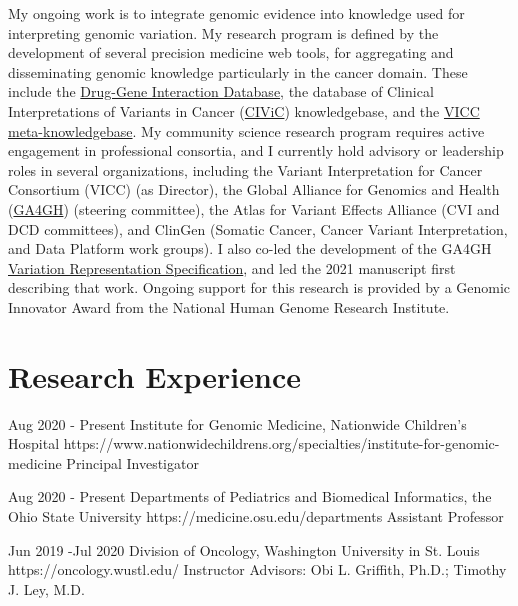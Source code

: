\documentclass[10pt]{article} %
\begin{document}
My ongoing work is to integrate genomic evidence into knowledge used for interpreting genomic variation. My research program is defined by the development of several precision medicine web tools, for aggregating and disseminating genomic knowledge particularly in the cancer domain. These include the \href{www.dgidb.org}{Drug-Gene Interaction Database}, the database of Clinical Interpretations of Variants in Cancer
(\href{https://www.civicdb.org}{CIViC}) knowledgebase, and the \href{https://search.cancervariants.org}{VICC meta-knowledgebase}. My community science research program requires active engagement in professional consortia, and I currently hold advisory or leadership roles in several organizations, including the Variant Interpretation for Cancer Consortium (VICC) (as Director), the Global Alliance for Genomics and Health (\href{https://ga4gh.org}{GA4GH}) (steering committee), the Atlas for Variant Effects Alliance (CVI and DCD committees), and ClinGen (Somatic Cancer, Cancer Variant Interpretation, and Data Platform work groups). I also co-led the development of the GA4GH \href{https://vrs.ga4gh.org}{Variation Representation Specification}, and led the 2021 manuscript first describing that work. Ongoing support for this research is provided by a Genomic Innovator Award
from the National Human Genome Research Institute.


\section{Research Experience}

\compjob
{Aug 2020 - }{Present}
{Institute for Genomic Medicine, Nationwide Children's Hospital}
{https://www.nationwidechildrens.org/specialties/institute-for-genomic-medicine}
{Principal Investigator}


\compjob
{Aug 2020 - }{Present}
{Departments of Pediatrics and Biomedical Informatics, the Ohio State University}
{https://medicine.osu.edu/departments}
{Assistant Professor}


\job
{Jun 2019 -}{Jul 2020}
{Division of Oncology, Washington University in St. Louis}
{https://oncology.wustl.edu/}
{Instructor}
{Advisors: Obi L. Griffith, Ph.D.; Timothy J. Ley, M.D.}
\end{document}
